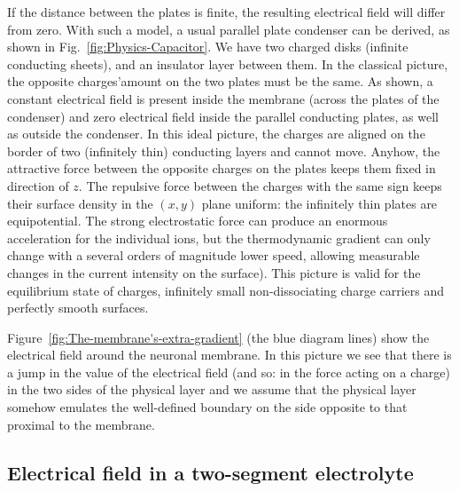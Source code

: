 If the 
distance between the plates is finite, the resulting electrical field will differ from zero. 
With such a model, a usual parallel plate condenser can be derived, as shown in Fig.~\ref{fig:Physics-Capacitor}.
We have two charged disks (infinite conducting sheets), and 
an insulator layer between them. In the classical picture, 
the opposite charges'amount on the two plates must be the same.
As shown, a constant electrical field is present inside the membrane (across the plates of the condenser) and zero electrical field inside the parallel conducting plates, as well as outside the condenser.
In this ideal picture, the charges are aligned on the border of two (infinitely thin) conducting layers and cannot move.
Anyhow, the attractive force between the opposite charges on the plates 
keeps them fixed in direction of $z$. The repulsive force
between the charges with the same sign keeps their surface density in the $(x,y)$ plane uniform: the infinitely thin plates are equipotential.
The strong electrostatic force can produce an enormous acceleration for the individual ions, but the thermodynamic gradient can only change with a several orders of magnitude lower speed, allowing measurable changes in the current intensity on the surface).
This picture is valid for the equilibrium state of charges, infinitely small non-dissociating charge carriers and perfectly smooth surfaces. 

Figure~\ref{fig:The-membrane's-extra-gradient} (the blue diagram lines) show the electrical field around the neuronal membrane.
In this picture we see that there is a jump in the value of the electrical field (and so: in the force acting on a charge)
in the two sides of the physical layer and we assume that the physical layer somehow emulates the well-defined boundary
on the side opposite to that proximal to the membrane. 




\subsection[Electrical field]{Electrical field in a two-segment electrolyte\label{sec:Physics-ElectricalField}}

